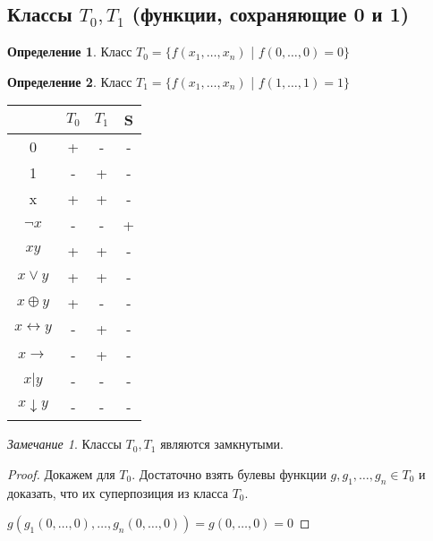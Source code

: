 \documentclass[a4paper]{article}
\theoremstyle{definition}
\newtheorem*{definition}{Определение}
\theoremstyle{remark}
\newtheorem*{remark}{Замечание}
\begin{document}
    \subsection{Классы $T_0, T_1$ (функции, сохраняющие 0 и 1)}
    \begin{definition}
        Класс $T_0 = \{f(x_1,\dots, x_n)$ | $f(0, \dots, 0) = 0\}$
    \end{definition}
    \begin{definition}
        Класс $T_1 = \{f(x_1,\dots, x_n)$ | $f(1, \dots, 1) = 1\}$
    \end{definition}
    \begin{tabular}{c|c|c|c}
        & $T_0$ & $T_1$ & S\\
        \hline
        0 & + & - & - \\
        1 & - & + & - \\
        x & + & + & - \\
        $\neg x$ & - & - & + \\
        $xy$ & + & + & - \\
        $x \vee y$ & + & + & -\\
        $x\oplus y$ & + & - & -\\
        $x\leftrightarrow y$ & - & + & -\\
        $x\rightarrow$ & - & + & -\\
        $x|y$ & - & - & -\\
        $x\downarrow y$ & - & - & -\\
    \end{tabular}
    \begin{remark}
        Классы $T_0, T_1$ являются замкнутыми.
    \end{remark}
    \begin{proof}
        Докажем для $T_0$. Достаточно взять булевы функции $g, g_1, \dots, g_n\in T_0$
        и доказать, что их суперпозиция из класса $T_0.$

        $g(g_1 (0, \dots, 0), \dots, g_n(0, \dots, 0)) = g(0, \dots, 0) = 0$
    \end{proof}
\end{document}
